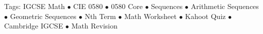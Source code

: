 \documentclass[11pt,a4paper]{article}
\begin{document}
\vspace{14pt}
\begin{center}
  \sffamily\scriptsize\textcolor{textmuted}{
    Tags: IGCSE Math $\bullet$ CIE 0580 $\bullet$ 0580 Core $\bullet$ Sequences $\bullet$ Arithmetic Sequences $\bullet$ Geometric Sequences $\bullet$ Nth Term $\bullet$ Math Worksheet $\bullet$ Kahoot Quiz $\bullet$ Cambridge IGCSE $\bullet$ Math Revision
  }
\end{center}
\end{document}
